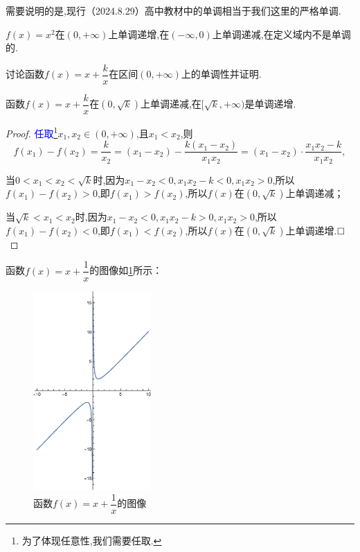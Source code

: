\documentclass[lang=cn,math=cm,chinesefont=nofont,11pt,scheme=chinese,twocol]{elegantbook}
\begin{document}
需要说明的是,现行（2024.8.29）高中教材中的单调相当于我们这里的严格单调.

\begin{example}
  $f(x)=x^2$在$(0,+\infty)$上单调递增,在$(-\infty,0)$上单调递减,在定义域内不是单调的.
\end{example}

\begin{spacing}{1.8}
  \begin{example}
    讨论函数$f(x)=x+\dfrac{k}{x}$在区间$(0,+\infty)$上的单调性并证明.
  \end{example}

  \begin{solution}
    函数$f(x)=x+\dfrac{k}{x}$在$(0,\sqrt{k})$上单调递减,在$[\sqrt{k},+\infty)$是单调递增.
  \end{solution}

  \begin{proof}
    \textcolor{blue}{任取}\footnote{为了体现任意性,我们需要任取.}$x_1,x_2\in (0,+\infty)$,且$x_1<x_2$,则$$f(x_1)-f(x_2)=\dfrac{k}{x_2}=(x_1-x_2)-\dfrac{k(x_1-x_2)}{x_1 x_2}=(x_1-x_2)\cdot \dfrac{x_1x_2-k}{x_1x_2},$$

    当$0<x_1<x_2<\sqrt{k}$时,因为$x_1-x_2<0,x_1x_2-k<0,x_1x_2>0$,所以$f(x_1)-f(x_2)>0$,即$f(x_1)>f(x_2)$,所以$f(x)$在$(0,\sqrt{k})$上单调递减；

    当$\sqrt{k}<x_1<x_2$时,因为$x_1-x_2<0,x_1x_2-k>0,x_1x_2>0$,所以$f(x_1)-f(x_2)<0$,即$f(x_1)<f(x_2)$,所以$f(x)$在$(0,\sqrt{k})$上单调递增.$\hfill\square$
  \end{proof}

\end{spacing}

\begin{remark}
  函数$f(x)=x+\dfrac{1}{x}$的图像如\ref{img:2.2.2function}所示：
\end{remark}

\begin{figure}[h]
  \centering
  \includegraphics[width=0.4\textwidth]{image/2.2.2function.eps}
  \caption{函数$f(x)=x+\dfrac{1}{x}$的图像}
  \label{img:2.2.2function}
\end{figure}
\end{document}
